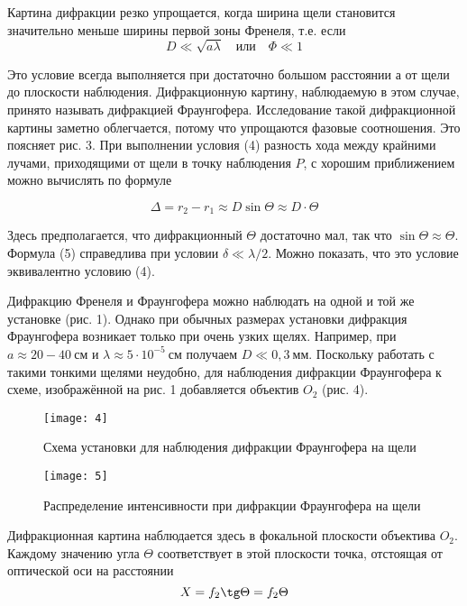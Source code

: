 \documentclass[a4paper, 12pt]{article}
\begin{document}
Картина дифракции резко упрощается, когда ширина щели становится
значительно меньше ширины первой зоны Френеля, т.е. если 
\begin{equation}
    D \ll \sqrt{a \lambda} \quad \text{или} \quad \Phi \ll 1
\end{equation}

Это условие всегда выполняется при достаточно большом расстоянии а от
щели до плоскости наблюдения. Дифракционную картину, наблюдаемую в
этом случае, принято называть дифракцией Фраунгофера. Исследование
такой дифракционной картины заметно облегчается, потому 
что упрощаются фазовые соотношения. Это поясняет рис. 3. При
выполнении условия (4) разность хода между крайними лучами,
приходящими от щели в точку наблюдения $P$, с хорошим приближением можно
вычислять по формуле

\begin{equation}
    \Delta = r_2-r_1 \approx D \sin \Theta \approx D \cdot \Theta
\end{equation}

Здесь предполагается, что дифракционный $\Theta$ достаточно мал, так
что $\sin \Theta \approx \Theta$. Формула (5) справедлива при условии
$\delta \ll \lambda/2$. Можно показать, что это условие эквивалентно
условию (4).

Дифракцию Френеля и Фраунгофера можно наблюдать на одной и той же
установке (рис. 1). Однако при обычных размерах установки дифракция
Фраунгофера возникает только при очень узких щелях. Например, при
$a \approx 20-40\ \text{см}$ и $\lambda \approx 5\cdot 10^{-5}\
\text{см}$ получаем $D \ll 0,3\ \text{мм}$. Поскольку работать с
такими тонкими щелями неудобно, для наблюдения дифракции Фраунгофера к
схеме, изображённой на рис. 1 добавляется объектив $O_2$ (рис. 4).

\begin{figure}[H]
    \texttt{[image: 4]} 
    \caption{Схема установки для наблюдения дифракции Фраунгофера на
    щели}
\end{figure}

\begin{wrapfigure}{r}{0.3\linewidth}
    \vspace{-10pt}
    \texttt{[image: 5]}
    \caption{Распределение интенсивности при дифракции Фраунгофера на
    щели}
\end{wrapfigure}

Дифракционная картина наблюдается здесь в фокальной плоскости
объектива $O_2$. Каждому значению угла $\Theta$ соответствует в этой
плоскости точка, отстоящая от оптической оси на расстоянии 
\begin{equation}
    X = f_2 \tg \Theta = f_2 \Theta
\end{equation}
\end{document}

